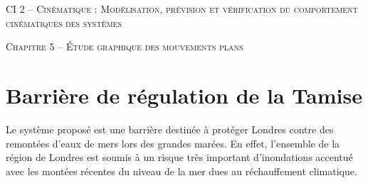 \documentclass[11pt,oneside]{article}
\begin{document}
\pagestyle{fancy}
\renewcommand{\headrulewidth}{0pt}

\fancyhead{}

\fancyhead[C]{\rule{12cm}{.5pt}}


\renewcommand{\footrulewidth}{0.2pt}

\fancyfoot[C]{\footnotesize{\bfseries \thepage}}



\begin{center}
 \LARGE\textsc{CI 2 -- Cinématique : Modélisation, prévision et vérification du comportement cinématiques des systèmes}
\end{center}

\begin{center}
 \Large\textsc{Chapitre 5 -- Étude graphique des mouvements plans} 
\end{center}

\vspace{1cm}

\section*{Barrière de régulation de la Tamise}

Le système proposé est une barrière destinée à protéger Londres contre des remontées
d'eaux de mers lors des grandes marées. En effet, l'ensemble de la région de Londres est soumis à un
risque très important d'inondations accentué avec les montées récentes du niveau de la mer dues au
réchauffement climatique.
\end{document}
